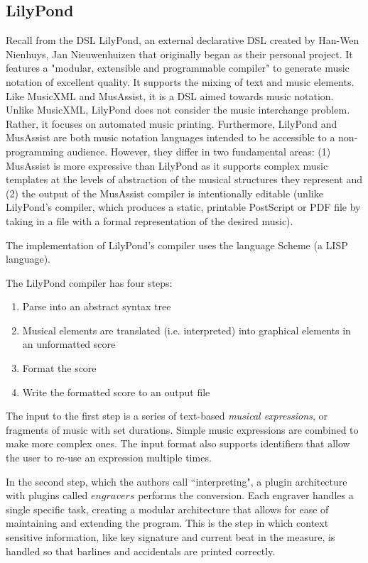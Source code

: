\documentclass{report}
\begin{document}
\subsection{LilyPond}
Recall from  the DSL LilyPond, an external declarative DSL created by Han-Wen Nienhuys, Jan Nieuwenhuizen that originally began as their personal project. It features a "modular, extensible and programmable compiler" to generate music notation of excellent quality. It supports the mixing of text and music elements.  Like MusicXML and MusAssist, it is a DSL aimed towards music notation. Unlike MusicXML, LilyPond does not consider the music interchange problem. Rather, it focuses on automated music printing. Furthermore, LilyPond and MusAssist are both music notation languages intended to be accessible to a non-programming audience. However, they differ in two fundamental areas: (1) MusAssist is more expressive than LilyPond as it supports complex music templates at the levels of abstraction of the musical structures they represent and (2) the output of the MusAssist compiler is intentionally editable (unlike LilyPond's compiler, which produces a static, printable PostScript or PDF file by taking in a file with a formal representation of the desired music).

The implementation of LilyPond's compiler uses the language Scheme (a LISP language). 

The LilyPond compiler has four steps:
\begin{enumerate}[noitemsep]
\item Parse into an abstract syntax tree
\item Musical elements are translated (i.e. interpreted) into graphical elements in an unformatted score
\item Format the score
\item Write the formatted score to an output file
\end{enumerate}

The input to the first step is a series of text-based \textit{musical expressions}, or fragments of music with set durations. Simple music expressions are combined to make more complex ones. The input format also supports identifiers that allow the user to re-use an expression multiple times.

In the second step, which the authors call ``interpreting", a plugin architecture with plugins called $engravers$ performs the conversion. Each engraver handles a single specific task, creating a modular architecture that allows for ease of maintaining and extending the program. This is the step in which context sensitive information, like key signature and current beat in the measure, is handled so that barlines and accidentals are printed correctly.
\end{document}
